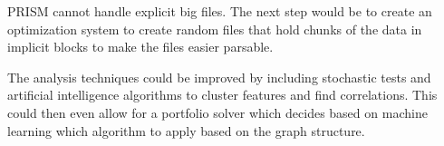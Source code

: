 PRISM cannot handle explicit big files.
The next step would be to create an optimization system to create random files that hold chunks of the data in implicit blocks to make the files easier parsable.

The analysis techniques could be improved by including stochastic tests and artificial intelligence algorithms to cluster features and find correlations.
This could then even allow for a portfolio solver which decides based on machine learning which algorithm to apply based on the graph structure.